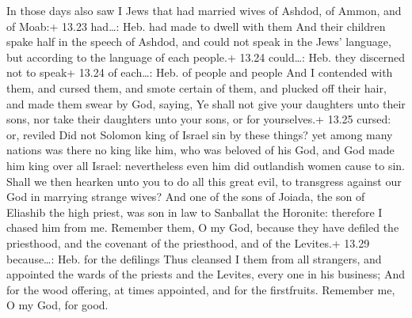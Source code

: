  In those days also saw I Jews that had married wives of
Ashdod, of Ammon, and of Moab:+ 13.23 had\ldots: Heb. had made to dwell
with them  And their children spake half in the speech of
Ashdod, and could not speak in the Jews' language, but according to the
language of each people.+ 13.24 could\ldots: Heb. they discerned not to
speak+ 13.24 of each\ldots: Heb. of people and people  And
I contended with them, and cursed them, and smote certain of them, and
plucked off their hair, and made them swear by God, saying, Ye shall not
give your daughters unto their sons, nor take their daughters unto your
sons, or for yourselves.+ 13.25 cursed: or, reviled  Did
not Solomon king of Israel sin by these things? yet among many nations
was there no king like him, who was beloved of his God, and God made him
king over all Israel: nevertheless even him did outlandish women cause
to sin.  Shall we then hearken unto you to do all this
great evil, to transgress against our God in marrying strange wives?
 And one of the sons of Joiada, the son of Eliashib the
high priest, was son in law to Sanballat the Horonite: therefore I
chased him from me.  Remember them, O my God, because they
have defiled the priesthood, and the covenant of the priesthood, and of
the Levites.+ 13.29 because\ldots: Heb. for the defilings 
Thus cleansed I them from all strangers, and appointed the wards of the
priests and the Levites, every one in his business;  And
for the wood offering, at times appointed, and for the firstfruits.
Remember me, O my God, for good.

